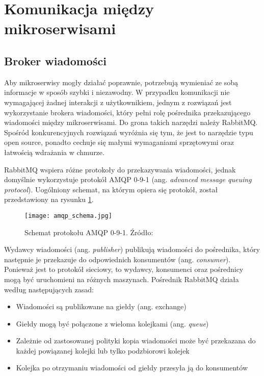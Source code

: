 \newpage
\section{Komunikacja między mikroserwisami}
\label{section:komunikacja-miedzy-serwisami}
\subsection{Broker wiadomości}
Aby mikroserwisy mogły działać poprawnie, potrzebują wymieniać ze sobą informacje 
w sposób szybki i niezawodny. W przypadku komunikacji nie wymagającej żadnej interakcji 
z użytkownikiem, jednym z rozwiązań jest wykorzystanie brokera wiadomości, który pełni 
rolę pośrednika przekazującego wiadomości między mikroserwisami. Do grona takich narzędzi 
należy RabbitMQ. Spośród konkurencyjnych rozwiązań wyróżnia się tym, że jest to 
narzędzie typu open source, ponadto cechuje się małymi wymaganiami sprzętowymi oraz 
łatwością wdrażania w chmurze. 

RabbitMQ wspiera różne protokoły do przekazywania wiadomości, jednak domyślnie 
wykorzystuje protokół AMQP 0-9-1 (ang. \textit{advanced message queuing protocol}). Uogólniony 
schemat, na którym opiera się protokół, został przedstawiony na rysunku \ref{fig:schemat-amqp}.

\begin{figure}[h]
    \centering
    \texttt{[image: amqp\_schema.jpg]}
    \caption{Schemat protokołu AMQP 0-9-1. Źródło: \cite{rabbitmq2022}}
    \label{fig:schemat-amqp}
\end{figure}

Wydawcy wiadomości (ang. \textit{publisher}) publikują wiadomości do pośrednika, który następnie 
je przekazuje do odpowiednich konsumentów (ang. \textit{consumer}). Ponieważ jest to protokół 
sieciowy, to wydawcy, konsumenci oraz pośrednicy mogą być uruchomieni na różnych 
maszynach. Pośrednik RabbitMQ działa według następujących zasad:

\begin{itemize} %
    \item Wiadomości są publikowane na giełdy (ang. exchange)
    \item Giełdy mogą być połączone z wieloma kolejkami (ang. \textit{queue})
    \item Zależnie od zastosowanej polityki kopia wiadomości może być przekazana do 
    każdej powiązanej kolejki lub tylko podzbiorowi kolejek
    \item Kolejka po otrzymaniu wiadomości od giełdy przesyła ją do konsumentów
\end{itemize}

